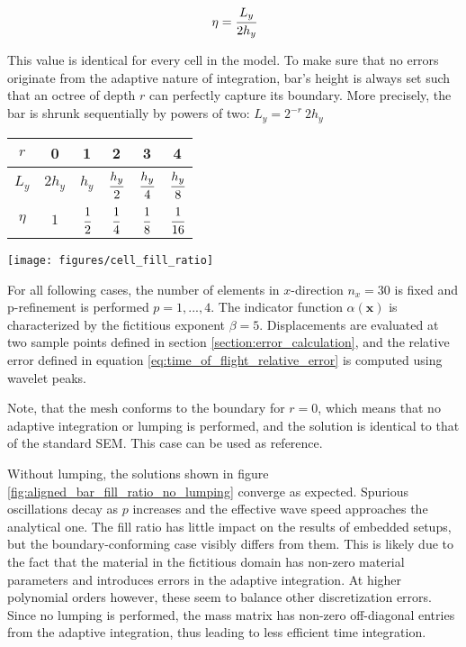 \begin{equation} \label{eq:fill_ratio}
	\eta = \cfrac{L_y}{2h_y}
\end{equation}

This value is identical for every cell in the model. To make sure that no errors originate from the adaptive nature of integration, bar's height is always set such that an octree of depth $r$ can perfectly capture its boundary. More precisely, the bar is shrunk sequentially by powers of two: $L_y = 2 ^{-r} \ 2h_y$

\begin{center}
\begin{minipage}[b]{0.45\textwidth}
	\centering
	\bgroup
		\def\arraystretch{2.5}
		\begin{tabular}{|c||c|c|c|c|c|}
			\hline
			$r$ & 0 & 1 & 2 & 3 & 4 \\
			\hline
			$L_y$ & $2h_y$ & $h_y$ & $\cfrac{h_y}{2}$ & $\cfrac{h_y}{4}$ & $\cfrac{h_y}{8}$ \\ 
			\hline
			$\eta$ & $1$ & $\cfrac{1}{2}$ & $\cfrac{1}{4}$ & $\cfrac{1}{8}$ & $\cfrac{1}{16}$ \\
			\hline
		\end{tabular}
	\egroup
\end{minipage}
\hfill
\begin{minipage}[b]{0.45\textwidth}
	\centering
	\texttt{[image: figures/cell\_fill\_ratio]}
\end{minipage}
\end{center}

For all following cases, the number of elements in $x$-direction $n_x=30$ is fixed and p-refinement is performed $p=1,...,4$. The indicator function $\alpha(\mathbf x)$ is characterized by the fictitious exponent $\beta = 5$. Displacements are evaluated at two sample points defined in section \ref{section:error_calculation}, and the relative error defined in equation \ref{eq:time_of_flight_relative_error} is computed using wavelet peaks.

Note, that the mesh conforms to the boundary for $r=0$, which means that no adaptive integration or lumping is performed, and the solution is identical to that of the standard SEM. This case can be used as reference.

Without lumping, the solutions shown in figure \ref{fig:aligned_bar_fill_ratio_no_lumping} converge as expected. Spurious oscillations decay as $p$ increases and the effective wave speed approaches the analytical one. The fill ratio has little impact on the results of embedded setups, but the boundary-conforming case visibly differs from them. This is likely due to the fact that the material in the fictitious domain has non-zero material parameters and introduces errors in the adaptive integration. At higher polynomial orders however, these seem to balance other discretization errors.
Since no lumping is performed, the mass matrix has non-zero off-diagonal entries from the adaptive integration, thus leading to less efficient time integration.

